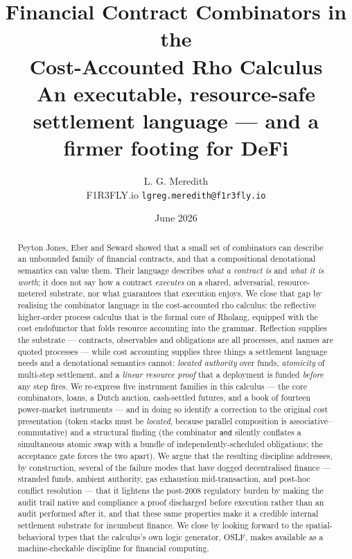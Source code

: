 \documentclass[11pt]{article}
\title{\textbf{Financial Contract Combinators in the\\ Cost-Accounted Rho Calculus}\\[4pt]
\large An executable, resource-safe settlement language --- and a firmer footing for DeFi}
\author{L. G. Meredith\\ \small F1R3FLY.io \quad\textemdash\quad \texttt{lgreg.meredith@f1r3fly.io}}
\date{June 2026}
\theoremstyle{definition}
\theoremstyle{plain}
\newcommand{\rcalc}{rho calculus}
\begin{document}
\maketitle

\begin{abstract}
Peyton Jones, Eber and Seward showed that a small set of combinators can describe an
unbounded family of financial contracts, and that a compositional denotational semantics
can value them. Their language describes \emph{what a contract is} and \emph{what it is
worth}; it does not say how a contract \emph{executes} on a shared, adversarial, resource-metered
substrate, nor what guarantees that execution enjoys. We close that gap by realising the
combinator language in the cost-accounted \rcalc: the reflective higher-order process calculus
that is the formal core of Rholang, equipped with the cost endofunctor that folds resource
accounting into the grammar. Reflection supplies the substrate --- contracts, observables and
obligations are all processes, and names are quoted processes --- while cost accounting supplies
three things a settlement language needs and a denotational semantics cannot: \emph{located
authority} over funds, \emph{atomicity} of multi-step settlement, and a \emph{linear resource
proof} that a deployment is funded \emph{before} any step fires. We re-express five instrument
families in this calculus --- the core combinators, loans, a Dutch auction, cash-settled futures,
and a book of fourteen power-market instruments --- and in doing so identify a correction to the
original cost presentation (token stacks must be \emph{located}, because parallel composition is
associative--commutative) and a structural finding (the combinator \texttt{and} silently conflates
a simultaneous atomic swap with a bundle of independently-scheduled obligations; the acceptance gate
forces the two apart). We argue that the resulting discipline addresses, by construction, several
of the failure modes that have dogged decentralised finance --- stranded funds, ambient authority,
gas exhaustion mid-transaction, and post-hoc conflict resolution --- that it lightens the post-2008
regulatory burden by making the audit trail native and compliance a proof discharged before execution
rather than an audit performed after it, and that these same properties make it a credible internal
settlement substrate for incumbent finance. We close by looking forward
to the spatial-behavioral types that the calculus's own logic generator, OSLF, makes available as a
machine-checkable discipline for financial computing.
\end{abstract}
\end{document}
